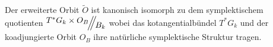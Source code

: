 \begin{comment}
\begin{beh}
$\dim(\tilde O)=\dim(O)+2n$
\end{beh}
\end{comment}
\begin{comment}
\ccite[p27]{thboalch}
\[
\Theta :=\left\{ A\in\mathfrak g_k^*\mid (g_0,A)\in\tilde O
  \text{ für ein passendes } g_0\in\GL_n(\C) \right\}
\]
ist der Kern der Projektion
\[
\tilde O\to\mathfrak g_k^*;\qquad (g_0,A)\mapsto A
\]
\begin{cor}
\ccite[Corollary 2.15]{thboalch}
The extended orbit $\tilde O$ is a principal $T$ bundle over $\theta$.
\end{cor}
\end{comment}
\begin{comment}
Wie sieht denn die $B_k$ Wirkung auf $T^*G_k\times O_B$ aus?\\
Siehe: \cite[Definition 1.47]{thboalch}
\begin{defn} \ccite[Definition 1.47]{thboalch}
Die \emph{links Wirkung} von $G$ auf $T^*G$ ist \comm{(in terms of left
trivialisation)}:
\[
\beta(g,A)=(\beta g,A)\,.
\]
Die \emph{rechts Wirkung} ...
\end{defn}
\begin{lem} \ccite[Lemma 1.48]{thboalch}
Die links Wirkung von $G$ auf $T^*G$ ist Hamiltonisch mit einer
equivarianten momenten Abbildung gegeben \comm{(in terms of left
trivialisation)} durch
\[
\mu_L:G\times\mathfrak g^* \to \mathfrak g^*; \qquad (g,A)\mapsto -\Ad_g^*(A)
\]
Die rechts Wirkung ...
\end{lem}
Und $B_k$ wirkt auf $O_B$ durch Konjungation.\\
Damit ergibt sich zusammen die $B_k$ Wirkung auf $T^*G_k\times O_B$ durch 
\[
\beta(g,A,B)=(\beta g,A,\beta B\beta^{-1})
\]
\end{comment}
\begin{lem}
Der erweiterte Orbit $\tilde O$ ist kanonisch isomorph zu dem symplektischem
quotienten $\symplquot{T^*G_k\times O_B}{B_k}$ wobei das kotangentialbündel
$T^*G_k$ und der koadjungierte Orbit $O_B$ ihre natürliche symplektische
Struktur tragen.
\begin{comment}
Entspricht
\cite[Proposition 2.19]{thboalch}
zusammen mit
\cite[Remark 2.20]{thboalch}
\end{comment}
\end{lem}
